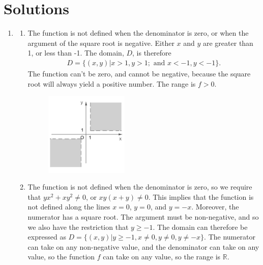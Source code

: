 \section*{Solutions}
\begin{enumerate}
\item 
\begin{enumerate}
\item The function is not defined when the denominator is zero, or when the argument of the square root is negative. Either $x$ and $y$ are greater than 1, or less than -1. The domain, $D$, is therefore
\begin{align*}D = \{(x,y)|x > 1, y > 1; \text{ and } x < -1, y < -1\}. \end{align*}
The function can't be zero, and cannot be negative, because the square root will always yield a positive number. The range is $f > 0$.  
\begin{figure}[!htbp]
  \begin{center}
    \includegraphics[width=0.4\textwidth]{Img1A.jpg}
  \end{center}
\end{figure}
\item The function is not defined when the denominator is zero, so we require that $yx^2+xy^2\ne0$, or $xy(x+y)\ne0$. This implies that the function is not defined along the lines $x=0$, $y=0$, and $y=-x$. Moreover, the numerator has a square root. The argument must be non-negative, and so we also have the restriction that $y\ge-1$. The domain can therefore be expressed as $D=\{(x,y)| y\ge -1, x\ne0, y\ne0, y\ne-x\}$. The numerator can take on any non-negative value, and the denominator can take on any value, so the function $f$ can take on any value, so the range is $\mathbb{R}$.

\end{enumerate}
\end{enumerate}
